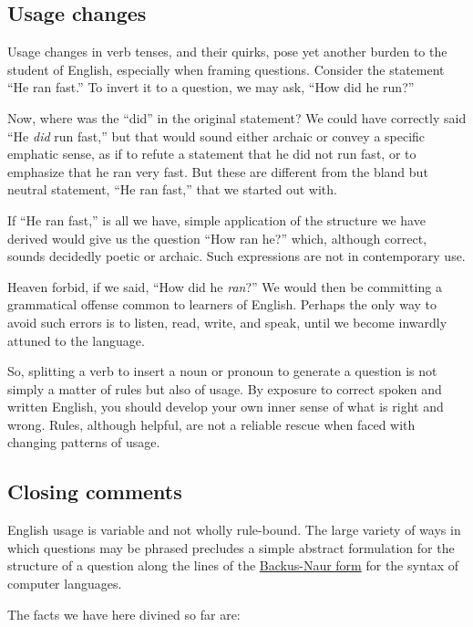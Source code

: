 \documentclass[
  12pt,
  a4paper,
]{article}
\begin{document}
\hypertarget{usage-changes}{%
\subsection{Usage changes}\label{usage-changes}}

Usage changes in verb tenses, and their quirks, pose yet another burden
to the student of English, especially when framing questions. Consider
the statement ``He ran fast.'' To invert it to a question, we may ask,
``How did he run?''

Now, where was the ``did'' in the original statement? We could have
correctly said ``He \emph{did} run fast,'' but that would sound either
archaic or convey a specific emphatic sense, as if to refute a statement
that he did not run fast, or to emphasize that he ran very fast. But
these are different from the bland but neutral statement, ``He ran
fast,'' that we started out with.

If ``He ran fast,'' is all we have, simple application of the structure
we have derived would give us the question ``How ran he?'' which,
although correct, sounds decidedly poetic or archaic. Such expressions
are not in contemporary use.

Heaven forbid, if we said, ``How did he \emph{ran}?'' We would then be
committing a grammatical offense common to learners of English. Perhaps
the only way to avoid such errors is to listen, read, write, and speak,
until we become inwardly attuned to the language.

So, splitting a verb to insert a noun or pronoun to generate a question
is not simply a matter of rules but also of usage. By exposure to
correct spoken and written English, you should develop your own inner
sense of what is right and wrong. Rules, although helpful, are not a
reliable rescue when faced with changing patterns of usage.

\hypertarget{closing-comments}{%
\subsection{Closing comments}\label{closing-comments}}

English usage is variable and not wholly rule-bound. The large variety
of ways in which questions may be phrased precludes a simple abstract
formulation for the structure of a question along the lines of the
\href{http://en.wikipedia.org/wiki/Backus_Naur_form}{Backus-Naur form}
for the syntax of computer languages.

The facts we have here divined so far are:
\end{document}
